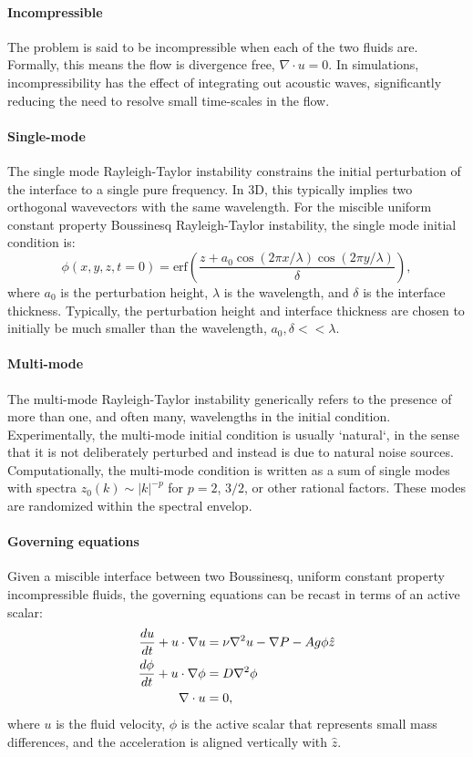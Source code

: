 \paragraph{Incompressible}
The problem is said to be incompressible when each of the two fluids are.
Formally, this means the flow is divergence free, $\nabla \cdot u = 0$.
In simulations, incompressibility has the effect of integrating out acoustic waves, significantly reducing the need to resolve small time-scales in the flow.

\paragraph{Single-mode}
The single mode Rayleigh-Taylor instability constrains the initial perturbation of the interface to a single pure frequency.
In 3D, this typically implies two orthogonal wavevectors with the same wavelength.
For the miscible uniform constant property Boussinesq Rayleigh-Taylor instability, the single mode initial condition is:
\begin{equation}
\phi(x,y,z,t=0) = \text{erf}\left(\frac{z + a_0 \cos(2 \pi x / \lambda) \cos(2 \pi y/\lambda)}{\delta}\right),
\end{equation}
where $a_0$ is the perturbation height,
$\lambda$ is the wavelength, and
$\delta$ is the interface thickness.
Typically, the perturbation height and interface thickness are chosen to initially be much smaller than the wavelength, $a_0, \delta << \lambda$.

\paragraph{Multi-mode}
The multi-mode Rayleigh-Taylor instability generically refers to the presence of more than one, and often many, wavelengths in the initial condition.
Experimentally, the multi-mode initial condition is usually `natural`, in the sense that it is not deliberately perturbed and instead is due to natural noise sources.
Computationally, the multi-mode condition is written as a sum of single modes with spectra $z_0(k) \sim |k|^{-p}$ for $p = 2$, $3/2$, or other rational factors.
These modes are randomized within the spectral envelop.

\paragraph{Governing equations}
Given a miscible interface between two Boussinesq, uniform constant property incompressible fluids, the governing equations can be recast in terms of an active scalar:
\begin{align}
\frac{d u}{d t} + u \cdot \nabla u &= \nu \nabla^2 u - \nabla P - A g \phi \hat{z}\\
\frac{d \phi}{d t} + u \cdot \nabla \phi &= D \nabla^2 \phi \\
\nabla \cdot u  &= 0,
\end{align}
where $u$ is the fluid velocity, 
$\phi$ is the active scalar that represents small mass differences,
and the acceleration is aligned vertically with $\hat{z}$.


